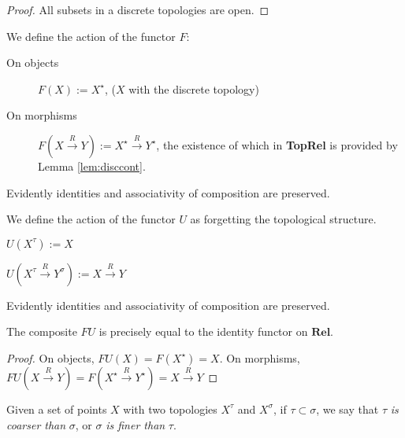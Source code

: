 \begin{lemma}\label{lem:disccont}
\begin{proof}
All subsets in a discrete topologies are open.
\end{proof}
\end{lemma}

\begin{defn} We define the action of the functor $F$:
\begin{description}
\item[On objects] $F(X) := X^\star$, ($X$ with the discrete topology)
\item[On morphisms] $F(X \overset{R}{\rightarrow} Y) := X^\star \overset{R}{\rightarrow} Y^\star$, the existence of which in \textbf{TopRel} is provided by Lemma \ref{lem:disccont}.
\end{description}
Evidently identities and associativity of composition are preserved.
\end{defn}

\begin{defn}
\begin{description} We define the action of the functor $U$ as forgetting the topological structure.
\item[On objects] $U(X^\tau) := X$
\item[On morphisms] $U(X^\tau \overset{R}{\rightarrow} Y^\sigma) := X \overset{R}{\rightarrow} Y$
\end{description}
Evidently identities and associativity of composition are preserved.
\end{defn}


\begin{lemma}[$FU = 1_{\textbf{Rel}}$]\label{lem:idadj}
The composite $FU$ is precisely equal to the identity functor on $\mathbf{Rel}$.
\begin{proof}
On objects, $FU(X) = F(X^\star) = X$. On morphisms, $FU(X \overset{R}{\rightarrow} Y) = F(X^\star \overset{R}{\rightarrow} Y^\star) = X \overset{R}{\rightarrow} Y$
\end{proof}
\end{lemma}

\begin{rem}
Given a set of points $X$ with two topologies $X^\tau$ and $X^\sigma$, if $\tau \subset \sigma$, we say that $\tau$ \emph{is coarser than} $\sigma$, or $\sigma$ \emph{is finer than} $\tau$.
\end{rem}

